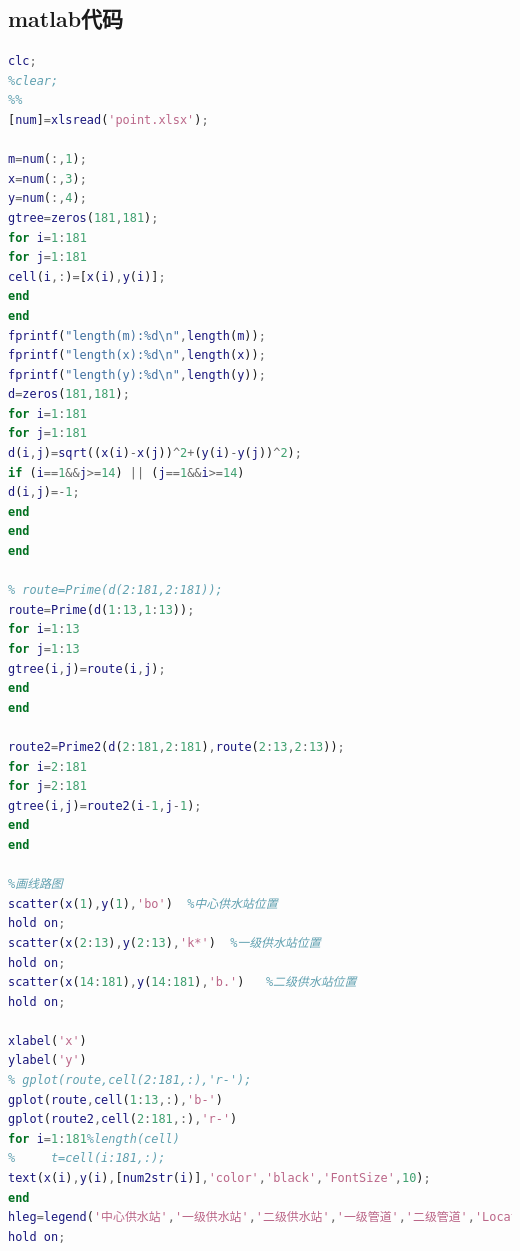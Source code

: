 \documentclass{whutmod}
\begin{document}
\subsection{matlab代码}
\begin{lstlisting}[language=matlab]
clc;
%clear;
%% 
[num]=xlsread('point.xlsx');

m=num(:,1);
x=num(:,3);
y=num(:,4);
gtree=zeros(181,181);
for i=1:181
for j=1:181
cell(i,:)=[x(i),y(i)];
end
end
fprintf("length(m):%d\n",length(m));
fprintf("length(x):%d\n",length(x));
fprintf("length(y):%d\n",length(y));
d=zeros(181,181);
for i=1:181
for j=1:181
d(i,j)=sqrt((x(i)-x(j))^2+(y(i)-y(j))^2);
if (i==1&&j>=14) || (j==1&&i>=14)
d(i,j)=-1;
end
end
end

% route=Prime(d(2:181,2:181));
route=Prime(d(1:13,1:13));
for i=1:13
for j=1:13
gtree(i,j)=route(i,j);
end
end

route2=Prime2(d(2:181,2:181),route(2:13,2:13));
for i=2:181
for j=2:181
gtree(i,j)=route2(i-1,j-1);
end
end

%画线路图
scatter(x(1),y(1),'bo')  %中心供水站位置
hold on;
scatter(x(2:13),y(2:13),'k*')  %一级供水站位置
hold on;
scatter(x(14:181),y(14:181),'b.')   %二级供水站位置
hold on;

xlabel('x')
ylabel('y')
% gplot(route,cell(2:181,:),'r-');
gplot(route,cell(1:13,:),'b-')
gplot(route2,cell(2:181,:),'r-')
for i=1:181%length(cell)
%     t=cell(i:181,:);
text(x(i),y(i),[num2str(i)],'color','black','FontSize',10);
end
hleg=legend('中心供水站','一级供水站','二级供水站','一级管道','二级管道','Location','NorthEastOutside');
hold on;
\end{lstlisting}
\end{document}
